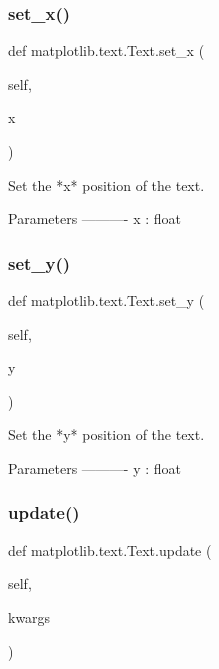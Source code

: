 \subsubsection{\texorpdfstring{set\+\_\+x()}{set\_x()}}
{\footnotesize\ttfamily def matplotlib.\+text.\+Text.\+set\+\_\+x (\begin{DoxyParamCaption}\item[{}]{self,  }\item[{}]{x }\end{DoxyParamCaption})}

\begin{DoxyVerb}Set the *x* position of the text.

Parameters
----------
x : float
\end{DoxyVerb}
 \mbox{\label{classmatplotlib_1_1text_1_1Text_a14a8a79e3d231e38dd4993d9b9753343}} 
\subsubsection{\texorpdfstring{set\+\_\+y()}{set\_y()}}
{\footnotesize\ttfamily def matplotlib.\+text.\+Text.\+set\+\_\+y (\begin{DoxyParamCaption}\item[{}]{self,  }\item[{}]{y }\end{DoxyParamCaption})}

\begin{DoxyVerb}Set the *y* position of the text.

Parameters
----------
y : float
\end{DoxyVerb}
 \mbox{\label{classmatplotlib_1_1text_1_1Text_a2479817b5993015028fcd9d2c58affab}} 
\subsubsection{\texorpdfstring{update()}{update()}}
{\footnotesize\ttfamily def matplotlib.\+text.\+Text.\+update (\begin{DoxyParamCaption}\item[{}]{self,  }\item[{}]{kwargs }\end{DoxyParamCaption})}

